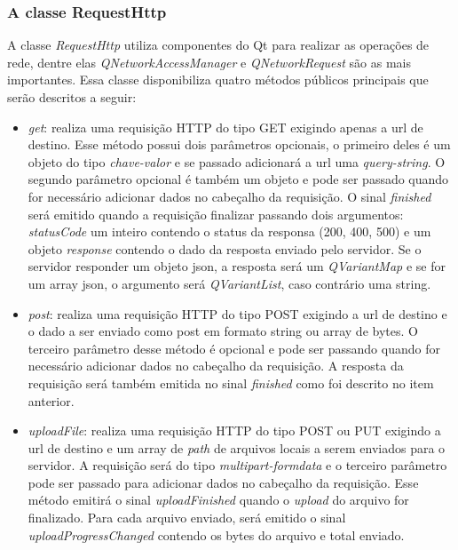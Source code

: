 \subsubsection{A classe RequestHttp}\label{sec:solucao-desenvolvida}
A classe \textit{RequestHttp} utiliza componentes do Qt para realizar as operações de rede, dentre elas \textit{QNetworkAccessManager} e \textit{QNetworkRequest} são as mais importantes. Essa classe disponibiliza quatro métodos públicos principais que serão descritos a seguir:

\begin{itemize}
	\item \textit{get}: realiza uma requisição HTTP do tipo GET exigindo apenas a url de destino. Esse método possui dois parâmetros opcionais, o primeiro deles é um objeto do tipo \textit{chave-valor} e se passado adicionará a url uma \textit{query-string}. O segundo parâmetro opcional é também um objeto e pode ser passado quando for necessário adicionar dados no cabeçalho da requisição. O sinal \textit{finished} será emitido quando a requisição finalizar passando dois argumentos: \textit{statusCode} um inteiro contendo o status da responsa (200, 400, 500) e um objeto \textit{response} contendo o dado da resposta enviado pelo servidor. Se o servidor responder um objeto json, a resposta será um \textit{QVariantMap} e se for um array json, o argumento será \textit{QVariantList}, caso contrário uma string.

	\item \textit{post}: realiza uma requisição HTTP do tipo POST exigindo a url de destino e o dado a ser enviado como post em formato string ou array de bytes. O terceiro parâmetro desse método é opcional e pode ser passando quando for necessário adicionar dados no cabeçalho da requisição. A resposta da requisição será também emitida no sinal \textit{finished} como foi descrito no item anterior.

	\item \textit{uploadFile}: realiza uma requisição HTTP do tipo POST ou PUT exigindo a url de destino e um array de \textit{path} de arquivos locais a serem enviados para o servidor. A requisição será do tipo \textit{multipart-formdata} e o terceiro parâmetro pode ser passado para adicionar dados no cabeçalho da requisição. Esse método emitirá o sinal \textit{uploadFinished} quando o \textit{upload} do arquivo for finalizado. Para cada arquivo enviado, será emitido o sinal \textit{uploadProgressChanged} contendo os bytes do arquivo e total enviado.


\end{itemize}
